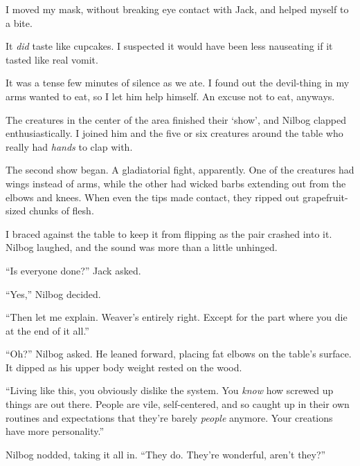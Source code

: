 I moved my mask, without breaking eye contact with Jack, and helped myself to a bite.



It \emph{did} taste like cupcakes.  I suspected it would have been less nauseating if it tasted like real vomit.



It was a tense few minutes of silence as we ate.  I found out the devil-thing in my arms wanted to eat, so I let him help himself.  An excuse not to eat, anyways.



The creatures in the center of the area finished their `show', and Nilbog clapped enthusiastically.   I joined him and the five or six creatures around the table who really had \emph{hands} to clap with.



The second show began.  A gladiatorial fight, apparently.  One of the creatures had wings instead of arms, while the other had wicked barbs extending out from the elbows and knees.  When even the tips made contact, they ripped out grapefruit-sized chunks of flesh.



I braced against the table to keep it from flipping as the pair crashed into it.  Nilbog laughed, and the sound was more than a little unhinged.



``Is everyone done?'' Jack asked.



``Yes,'' Nilbog decided.



``Then let me explain.  Weaver's entirely right.  Except for the part where you die at the end of it all.''



``Oh?'' Nilbog asked.  He leaned forward, placing fat elbows on the table's surface.  It dipped as his upper body weight rested on the wood.



``Living like this, you obviously dislike the system.  You \emph{know} how screwed up things are out there.  People are vile, self-centered, and so caught up in their own routines and expectations that they're barely \emph{people} anymore.  Your creations have more personality.''



Nilbog nodded, taking it all in.  ``They do.  They're wonderful, aren't they?''



